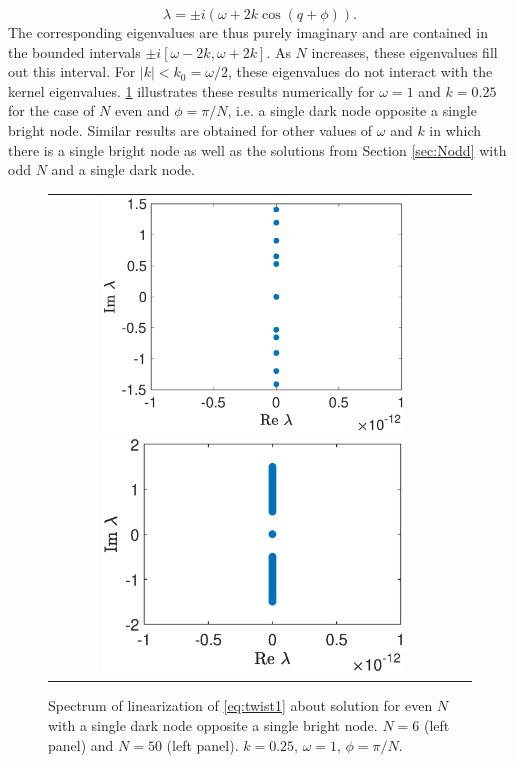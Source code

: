 \documentclass[12pt,reqno]{amsart}
\begin{document}
\begin{equation}\label{eq:dispersion}
\lambda = \pm i \left( \omega + 2 k \cos(q + \phi) \right).
\end{equation}
The corresponding eigenvalues are thus purely imaginary and are contained in the bounded intervals $\pm i[\omega - 2 k, \omega + 2 k]$. As $N$ increases, these eigenvalues fill out this interval. For $|k| < k_0 = \omega/2$, these eigenvalues do not interact with the kernel eigenvalues. \cref{fig:evenholespec} illustrates these results numerically for $\omega = 1$ and $k = 0.25$ for the case of $N$ even and $\phi = \pi/N$, i.e. a single dark node opposite a single bright node. Similar results are obtained for other values of $\omega$ and $k$ in which there is a single bright node as well as the solutions from Section \ref{sec:Nodd} with odd $N$ and a single dark node.
\begin{figure}[H]
\begin{center}
\begin{tabular}{cc}
\includegraphics[width=8cm]{images/evenhole6spec.eps}
\includegraphics[width=8cm]{images/evenhole50spec.eps}
\end{tabular}
\end{center}
\caption{Spectrum of linearization of \cref{eq:twist1} about solution for even $N$ with a single dark node opposite a single bright node. $N=6$ (left panel) and $N=50$ (left panel). $k=0.25$, $\omega = 1$, $\phi = \pi/N$.}
\label{fig:evenholespec}
\end{figure}
\end{document}
